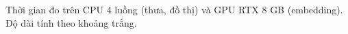 Thời gian đo trên CPU 4 luồng (thưa, đồ thị) và GPU RTX 8 GB (embedding). Độ dài tính theo khoảng trắng.
